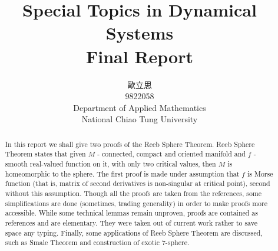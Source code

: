 \documentclass[8pt]{article} %
\title{Special Topics in Dynamical Systems\\Final Report\\}
\author{歐立思\\9822058\\Department of Applied Mathematics\\National Chiao Tung University}
\begin{document}
\begin{CJK}{UTF8}{bsmi}
\maketitle
\end{CJK}
\begin{abstract}
In this report we shall give two proofs of the Reeb Sphere Theorem. Reeb Sphere Theorem states that given $M$ - connected, compact and oriented manifold and $f$ - smooth real-valued function on it, with
only two critical values, then $M$ is homeomorphic to the sphere. The first proof is made under assumption that $f$ is Morse function (that is, matrix of second derivatives is non-singular at critical point), second
without this assumption. Though all the proofs are taken from the references, some simplifications are done (sometimes, trading generality) in order to make proofs more accessible. While some technical lemmas remain unproven,
proofs are contained as references and are elementary. They were taken out of current work rather to save space any typing. Finally, some applications of Reeb Sphere Theorem are discussed, such as Smale Theorem and construction of
exotic 7-sphere.
\end{abstract}
\end{document}
